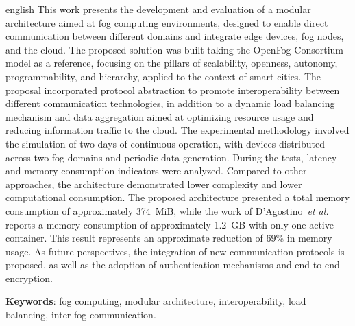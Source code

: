 \begin{resumo}[Abstract]
	\SingleSpacing
	\begin{otherlanguage*}{english}
		This work presents the development and evaluation of a modular architecture aimed at fog computing environments, designed to enable direct communication between different domains and integrate edge devices, fog nodes, and the cloud. The proposed solution was built taking the OpenFog Consortium model \cite{openfog2018} as a reference, focusing on the pillars of scalability, openness, autonomy, programmability, and hierarchy, applied to the context of smart cities. The proposal incorporated protocol abstraction to promote interoperability between different communication technologies, in addition to a dynamic load balancing mechanism and data aggregation aimed at optimizing resource usage and reducing information traffic to the cloud. The experimental methodology involved the simulation of two days of continuous operation, with devices distributed across two fog domains and periodic data generation. During the tests, latency and memory consumption indicators were analyzed. Compared to other approaches, the architecture demonstrated lower complexity and lower computational consumption. The proposed architecture presented a total memory consumption of approximately 374~MiB, while the work of D’Agostino~\textit{et al.} \cite{dagostino2025} reports a memory consumption of approximately 1.2~GB with only one active container. This result represents an approximate reduction of 69\% in memory usage. As future perspectives, the integration of new communication protocols is proposed, as well as the adoption of authentication mechanisms and end-to-end encryption.

		\textbf{Keywords}: fog computing, modular architecture, interoperability, load balancing, inter-fog communication.
	\end{otherlanguage*}
\end{resumo}

% 
%
%  

